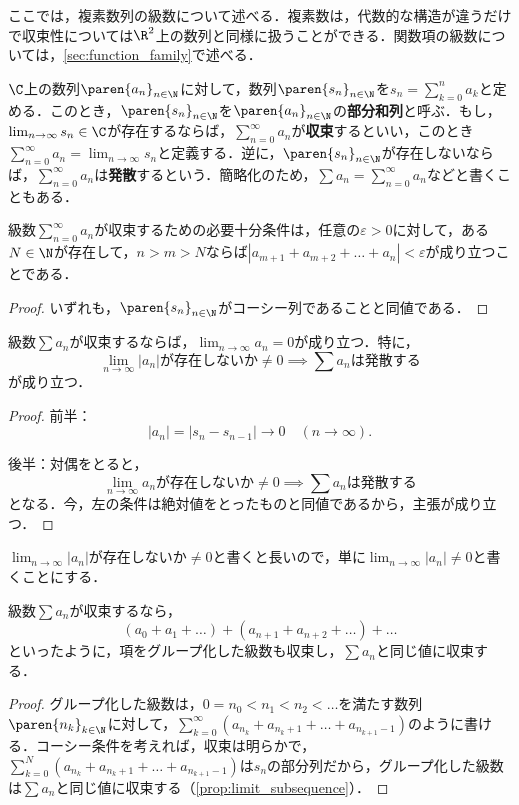 \documentclass[a4paper,10pt]{ltjsarticle}
\begin{document}
ここでは，複素数列の級数について述べる．複素数は，代数的な構造が違うだけで収束性については\(\R^2\)上の数列と同様に扱うことができる．関数項の級数については，\cref{sec:function_family}で述べる．

\(\C\)上の数列\(\paren{a_n}_{n\in\N}\)に対して，数列\(\paren{s_n}_{n\in\N}\)を\(s_n = \sum_{k=0}^n a_k\)と定める．このとき，\(\paren{s_n}_{n\in\N}\)を\(\paren{a_n}_{n\in\N}\)の\textbf{部分和列}と呼ぶ．もし，\(\lim_{n\to\infty}s_n\in\C\)が存在するならば，\(\sum_{n=0}^\infty a_n\)が\textbf{収束}するといい，このとき\(\sum_{n=0}^\infty a_n = \lim_{n\to\infty}s_n\)と定義する．逆に，\(\paren{s_n}_{n\in\N}\)が存在しないならば，\(\sum_{n=0}^\infty a_n\)は\textbf{発散}するという．簡略化のため，\(\sum a_n = \sum_{n=0}^\infty a_n\)などと書くこともある．

\begin{MyTheorem}
  級数\(\sum_{n=0}^\infty a_n\)が収束するための必要十分条件は，任意の\(\varepsilon > 0\)に対して，ある\(N \in \N\)が存在して，\(n > m > N\)ならば\(|a_{m+1} + a_{m+2} + \dots + a_n| < \varepsilon\)が成り立つことである．
\end{MyTheorem}
\begin{proof}
  いずれも，\(\paren{s_n}_{n\in\N}\)がコーシー列であることと同値である．
\end{proof}

\begin{MyCorollary}
  級数\(\sum a_n\)が収束するならば，\(\lim_{n\to\infty}a_n = 0\)が成り立つ．特に，
  \[ \lim_{n\to\infty}|a_n| が存在しないか\ne 0\implies \sum a_n は発散する \]
  が成り立つ．
\end{MyCorollary}
\begin{proof}
  前半：
  \[|a_n| = |s_n - s_{n-1}| \to 0 \quad (n \to \infty).\]

  後半：対偶をとると，
  \[ \lim_{n\to\infty}a_n が存在しないか\ne 0\implies \sum a_n は発散する \]
  となる．今，左の条件は絶対値をとったものと同値であるから，主張が成り立つ．
\end{proof}

\(\lim_{n\to\infty}|a_n| が存在しないか\ne 0\)と書くと長いので，単に\(\lim_{n\to\infty}|a_n| \ne 0\)と書くことにする．

\begin{MyProposition}
  級数\(\sum a_n\)が収束するなら，
  \[ (a_0 + a_1 + \dots) + (a_{n+1} + a_{n+2} + \dots) + \dots \]
  といったように，項をグループ化した級数も収束し，\(\sum a_n\)と同じ値に収束する．
\end{MyProposition}
\begin{proof}
  グループ化した級数は，\(0 = n_0 < n_1 < n_2 < \dots\)を満たす数列\(\paren{n_k}_{k\in\N}\)に対して，\(\sum_{k=0}^\infty (a_{n_k} + a_{n_k + 1} + \dots + a_{n_{k+1}-1})\)のように書ける．コーシー条件を考えれば，収束は明らかで，\(\sum_{k=0}^N (a_{n_k} + a_{n_k + 1} + \dots + a_{n_{k+1}-1})\)は\(s_n\)の部分列だから，グループ化した級数は\(\sum a_n\)と同じ値に収束する（\cref{prop:limit_subsequence}）．
\end{proof}
\end{document}
